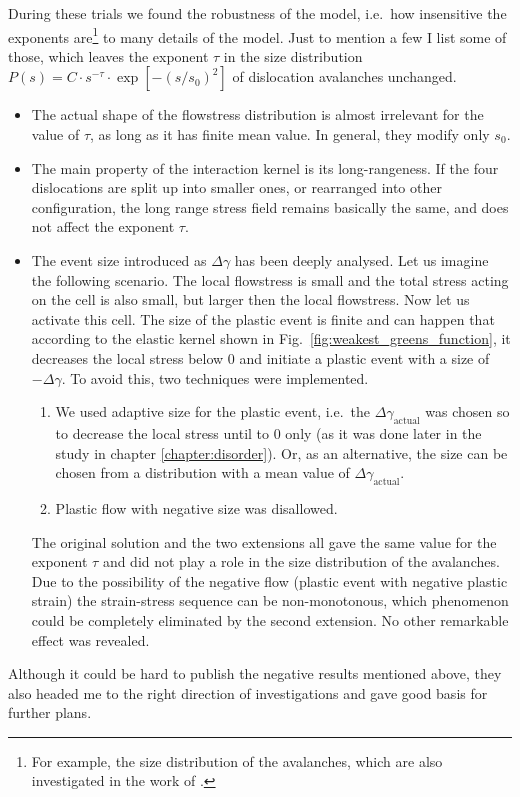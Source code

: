 During these trials we found the robustness of the model, i.e.\ how insensitive the exponents are\footnote{For example, the size distribution of the avalanches, which are also investigated in the work of \cite{Csikor251}.} to many details of the model. Just to mention a few I list some of those, which leaves the exponent $\tau$ in the size distribution $P\left( s \right) = C \cdot {s^{ - \tau }} \cdot \exp \left[ { - {{\left( {s/{s_0}} \right)}^2}} \right]$ of dislocation avalanches unchanged.
\begin{itemize}
\item The actual shape of the flowstress distribution is almost irrelevant for the value of $\tau$, as long as it has finite mean value. In general, they modify only $s_0$.
\item The main property of the interaction kernel is its long-rangeness. If the four dislocations are split up into smaller ones, or rearranged into other configuration, the long range stress field remains basically the same, and does not affect the exponent $\tau$.
\item The event size introduced as $\Delta \gamma$ has been deeply analysed. Let us imagine the following scenario. The local flowstress is small and the total stress acting on the cell is also small, but larger then the local flowstress. Now let us activate this cell. The size of the plastic event is finite and can happen that according to the elastic kernel shown in Fig.~\ref{fig:weakest_greens_function}, it decreases the local stress below 0 and initiate a plastic event with a size of $-\Delta \gamma$. To avoid this, two techniques were implemented.
\begin{enumerate}
\item We used adaptive size for the plastic event, i.e.\ the $\Delta {\gamma _{{\text{actual}}}}$ was chosen so to decrease the local stress until to 0 only (as it was done later in the study in chapter \ref{chapter:disorder}). Or, as an alternative, the size can be chosen from a distribution with a mean value of $\Delta {\gamma _{{\text{actual}}}}$.
\item Plastic flow with negative size was disallowed.
\end{enumerate}
The original solution and the two extensions all gave the same value for the exponent $\tau$ and did not play a role in the size distribution of the avalanches. Due to the possibility of the negative flow (plastic event with negative plastic strain) the strain-stress sequence can be non-monotonous, which phenomenon could be completely eliminated by the second extension. No other remarkable effect was revealed.
\end{itemize}

Although it could be hard to publish the negative results mentioned above, they also headed me to the right direction of investigations and gave good basis for further plans.
